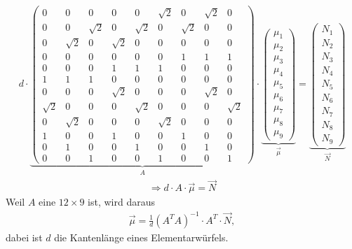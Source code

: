 \begin{align}
	d \cdot
	\underbrace{
	\begin{pmatrix}
		0 & 0 & 0  & 0 & 0 & \sqrt{2} & 0  & \sqrt{2} & 0\\
		 0&0  &\sqrt{2} & 0 & \sqrt{2} & 0 & \sqrt{2} & 0 & 0\\
		 0& \sqrt{2} & 0 & \sqrt{2} & 0 &0 &0  &0  &0 \\
		0&0 &0 &0 &0 &0 & 1 & 1 & 1\\
		0&0 &0 & 1 & 1 & 1 &0 &0 &0 \\
		1 & 1& 1 & 0&0 &0 &0 &0 &0\\
		0&0 &0 & \sqrt{2} & 0 &0 &0& \sqrt{2} &0\\
		\sqrt{2} & 0 & 0& 0 &\sqrt{2} &0 &0 &0 &\sqrt{2}\\
		0 & \sqrt{2} & 0 & 0 & 0 & \sqrt{2} & 0 & 0 &0\\
		1 &0 &0  &1 &0 &0 & 1 & 0 &0 \\
		0 & 1 & 0 & 0 & 1 & 0 & 0 & 1 &0 \\
		0 & 0& 1 & 0 & 0 & 1 & 0 & 0 & 1
	\end{pmatrix}
	}_{A}
	\cdot
	\underbrace{
	\begin{pmatrix}
		\mu_1\\
		\mu_2\\
		\mu_3\\
		\mu_4\\
		\mu_5\\
		\mu_6\\
		\mu_7\\
		\mu_8\\
		\mu_9
	\end{pmatrix}
	}_{\vec{\mu}}
	=
	\underbrace{
	\begin{pmatrix}
		N_1\\
		N_2\\
		N_3\\
		N_4\\
		N_5\\
		N_6\\
		N_7\\
		N_8\\
		N_9		
	\end{pmatrix}
	}_{\vec{N}}\nonumber
\end{align}
\begin{align}	
	\Rightarrow d \cdot A\cdot\vec{\mu}=\vec{N}
\end{align}
Weil $A$ eine $12\times 9 $ ist, wird daraus
\begin{align}
	\vec{\mu}=\frac{1}{d}\left(A^TA\right)^{-1}\cdot A^T\cdot\vec{N},
		\label{eq:KleinsteQuadrate}
\end{align}
dabei ist $d$ die Kantenlänge eines Elementarwürfels.
